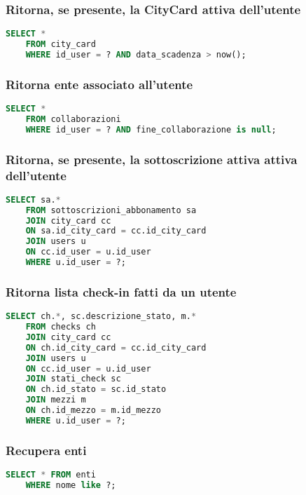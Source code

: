 \subsubsection{Ritorna, se presente, la CityCard attiva dell'utente}
\begin{lstlisting}[language=SQL]
	SELECT *
	FROM city_card
	WHERE id_user = ? AND data_scadenza > now();
\end{lstlisting}

\subsubsection{Ritorna ente associato all'utente}
\begin{lstlisting}[language=SQL]
	SELECT *
	FROM collaborazioni
	WHERE id_user = ? AND fine_collaborazione is null;
\end{lstlisting}


\subsubsection{Ritorna, se presente, la sottoscrizione attiva attiva dell'utente}
\begin{lstlisting}[language=SQL]
	SELECT sa.* 
	FROM sottoscrizioni_abbonamento sa
	JOIN city_card cc
	ON sa.id_city_card = cc.id_city_card
	JOIN users u
	ON cc.id_user = u.id_user
	WHERE u.id_user = ?;
\end{lstlisting}


\subsubsection{Ritorna lista check-in fatti da un utente}
\begin{lstlisting}[language=SQL]
	SELECT ch.*, sc.descrizione_stato, m.*
	FROM checks ch
	JOIN city_card cc
	ON ch.id_city_card = cc.id_city_card
	JOIN users u
	ON cc.id_user = u.id_user
	JOIN stati_check sc
	ON ch.id_stato = sc.id_stato
	JOIN mezzi m
	ON ch.id_mezzo = m.id_mezzo
	WHERE u.id_user = ?;
\end{lstlisting}


\subsubsection{Recupera enti}
\begin{lstlisting}[language=SQL]
	SELECT * FROM enti
	WHERE nome like ?;
\end{lstlisting}




